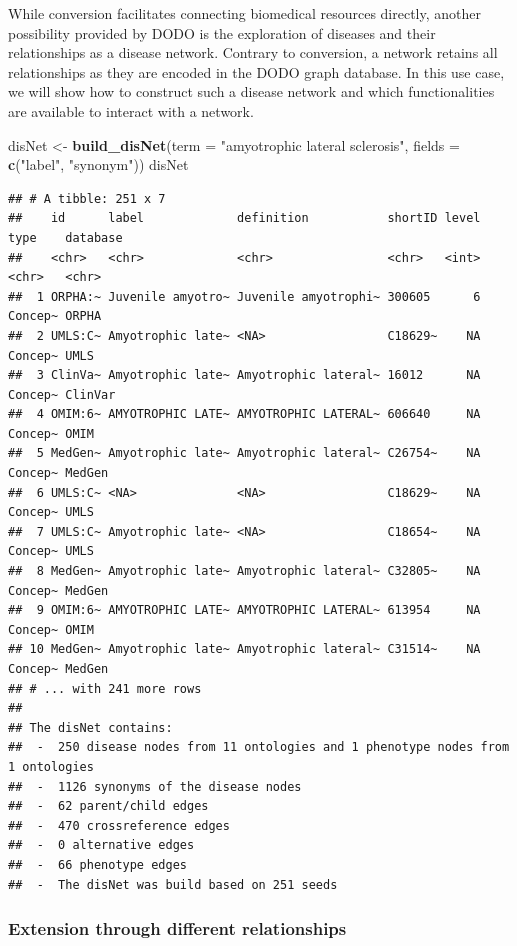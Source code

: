 \documentclass[9pt,a4paper,]{extarticle}
\newenvironment{Shaded}{\begin{snugshade}}{\end{snugshade}}
\newcommand{\DataTypeTok}[1]{\textcolor[rgb]{0.13,0.29,0.53}{#1}}
\newcommand{\KeywordTok}[1]{\textcolor[rgb]{0.13,0.29,0.53}{\textbf{#1}}}
\newcommand{\NormalTok}[1]{#1}
\newcommand{\StringTok}[1]{\textcolor[rgb]{0.31,0.60,0.02}{#1}}
\begin{document}
While conversion facilitates connecting biomedical resources directly, another possibility provided by DODO is the exploration of diseases and their relationships as a disease network. Contrary to conversion, a network retains all relationships as they are encoded in the DODO graph database. In this use case, we will show how to construct such a disease network and which functionalities are available to interact with a network.

\begin{Shaded}
\begin{Highlighting}[]
\NormalTok{disNet <-}\StringTok{ }\KeywordTok{build_disNet}\NormalTok{(}\DataTypeTok{term =} \StringTok{"amyotrophic lateral sclerosis"}\NormalTok{, }
                       \DataTypeTok{fields =} \KeywordTok{c}\NormalTok{(}\StringTok{"label"}\NormalTok{, }\StringTok{"synonym"}\NormalTok{))}
\NormalTok{disNet}
\end{Highlighting}
\end{Shaded}

\begin{verbatim}
## # A tibble: 251 x 7
##    id      label             definition           shortID level type    database
##    <chr>   <chr>             <chr>                <chr>   <int> <chr>   <chr>   
##  1 ORPHA:~ Juvenile amyotro~ Juvenile amyotrophi~ 300605      6 Concep~ ORPHA   
##  2 UMLS:C~ Amyotrophic late~ <NA>                 C18629~    NA Concep~ UMLS    
##  3 ClinVa~ Amyotrophic late~ Amyotrophic lateral~ 16012      NA Concep~ ClinVar 
##  4 OMIM:6~ AMYOTROPHIC LATE~ AMYOTROPHIC LATERAL~ 606640     NA Concep~ OMIM    
##  5 MedGen~ Amyotrophic late~ Amyotrophic lateral~ C26754~    NA Concep~ MedGen  
##  6 UMLS:C~ <NA>              <NA>                 C18629~    NA Concep~ UMLS    
##  7 UMLS:C~ Amyotrophic late~ <NA>                 C18654~    NA Concep~ UMLS    
##  8 MedGen~ Amyotrophic late~ Amyotrophic lateral~ C32805~    NA Concep~ MedGen  
##  9 OMIM:6~ AMYOTROPHIC LATE~ AMYOTROPHIC LATERAL~ 613954     NA Concep~ OMIM    
## 10 MedGen~ Amyotrophic late~ Amyotrophic lateral~ C31514~    NA Concep~ MedGen  
## # ... with 241 more rows
## 
## The disNet contains:
##  -  250 disease nodes from 11 ontologies and 1 phenotype nodes from 1 ontologies 
##  -  1126 synonyms of the disease nodes
##  -  62 parent/child edges
##  -  470 crossreference edges
##  -  0 alternative edges
##  -  66 phenotype edges
##  -  The disNet was build based on 251 seeds
\end{verbatim}

\hypertarget{extension-through-different-relationships}{%
\subsubsection{Extension through different relationships}\label{extension-through-different-relationships}}
\end{document}
